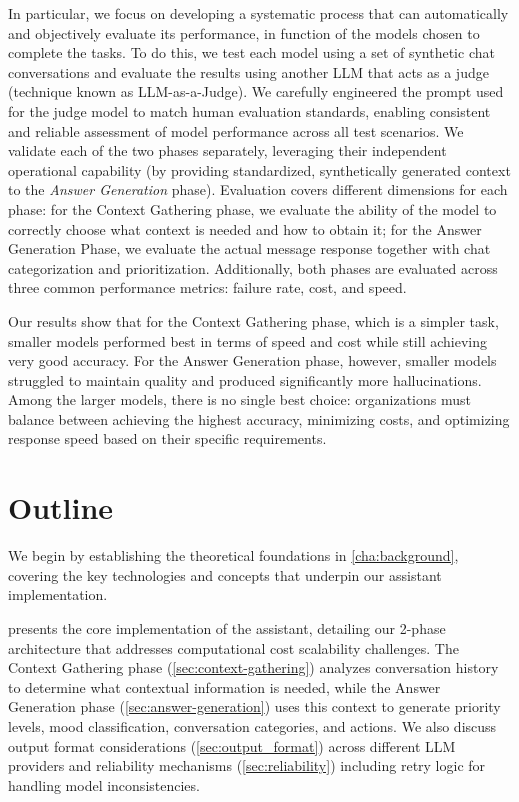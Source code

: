 
In particular, we focus on developing a systematic process that can automatically and objectively evaluate its performance, in function of the models chosen to complete the tasks.
To do this, we test each model using a set of synthetic chat conversations and evaluate the results using another LLM that acts as a judge (technique known as LLM-as-a-Judge).
We carefully engineered the prompt used for the judge model to match human evaluation standards, enabling consistent and reliable assessment of model performance across all test scenarios.
We validate each of the two phases separately, leveraging their independent operational capability (by providing standardized, synthetically generated context to the \textit{Answer Generation} phase).
Evaluation covers different dimensions for each phase: for the Context Gathering phase, we evaluate the ability of the model to correctly choose what context is needed and how to obtain it; for the Answer Generation Phase, we evaluate the actual message response together with chat categorization and prioritization.
Additionally, both phases are evaluated across three common performance metrics: failure rate, cost, and speed.

Our results show that for the Context Gathering phase, which is a simpler task, smaller models performed best in terms of speed and cost while still achieving very good accuracy.
For the Answer Generation phase, however, smaller models struggled to maintain quality and produced significantly more hallucinations.
Among the larger models, there is no single best choice: organizations must balance between achieving the highest accuracy, minimizing costs, and optimizing response speed based on their specific requirements.

\section{Outline}

We begin by establishing the theoretical foundations in \cref{cha:background}, covering the key technologies and concepts that underpin our assistant implementation.

 presents the core implementation of the assistant, detailing our 2-phase architecture that addresses computational cost scalability challenges.
The Context Gathering phase (\cref{sec:context-gathering}) analyzes conversation history to determine what contextual information is needed, while the Answer Generation phase (\cref{sec:answer-generation}) uses this context to generate priority levels, mood classification, conversation categories, and actions.
We also discuss output format considerations (\cref{sec:output_format}) across different LLM providers and reliability mechanisms (\cref{sec:reliability}) including retry logic for handling model inconsistencies.

